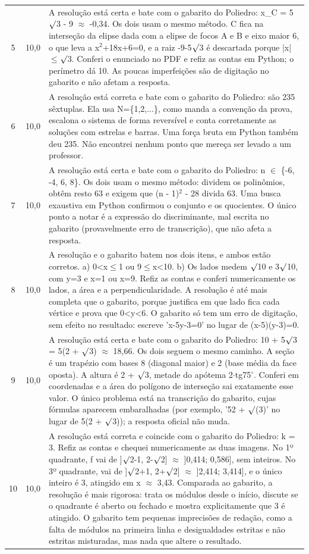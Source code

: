 \documentclass{article}%
\begin{document}
\begin{longtable}{@{}c c p{}@{}}
5 & 10,0 & A resolução está certa e bate com o gabarito do Poliedro: x\_C = 5$\surd$3 - 9 $\approx$ -0,34. Os dois usam o mesmo método. C fica na interseção da elipse dada com a elipse de focos A e B e eixo maior 6, o que leva a x$^2$+18x+6=0, e a raiz -9-5$\surd$3 é descartada porque |x|$\leq$$\surd$3. Conferi o enunciado no PDF e refiz as contas em Python; o perímetro dá 10. As poucas imperfeições são de digitação no gabarito e não afetam a resposta. \\
6 & 10,0 & A resolução está correta e bate com o gabarito do Poliedro: são 235 sêxtuplas. Ela usa N=\{1,2,...\}, como manda a convenção da prova, escalona o sistema de forma reversível e conta corretamente as soluções com estrelas e barras. Uma força bruta em Python também deu 235. Não encontrei nenhum ponto que mereça ser levado a um professor. \\
7 & 10,0 & A resolução está certa e bate com o gabarito do Poliedro: n $\in$ \{-6, -4, 6, 8\}. Os dois usam o mesmo método: dividem os polinômios, obtêm resto 63 e exigem que (n - 1)$^2$ - 28 divida 63. Uma busca exaustiva em Python confirmou o conjunto e os quocientes. O único ponto a notar é a expressão do discriminante, mal escrita no gabarito (provavelmente erro de transcrição), que não afeta a resposta. \\
8 & 10,0 & A resolução e o gabarito batem nos dois itens, e ambos estão corretos. a) 0<x$\leq$1 ou 9$\leq$x<10. b) Os lados medem $\surd$10 e 3$\surd$10, com y=3 e x=1 ou x=9. Refiz as contas e conferi numericamente os lados, a área e a perpendicularidade. A resolução é até mais completa que o gabarito, porque justifica em que lado fica cada vértice e prova que 0<y<6. O gabarito só tem um erro de digitação, sem efeito no resultado: escreve 'x-5y-3=0' no lugar de (x-5)(y-3)=0. \\
9 & 10,0 & A resolução está certa e bate com o gabarito do Poliedro: 10 + 5$\surd$3 = 5(2 + $\surd$3) $\approx$ 18,66. Os dois seguem o mesmo caminho. A seção é um trapézio com bases 8 (diagonal maior) e 2 (base média da face oposta). A altura é 2 + $\surd$3, metade do apótema 2$\cdot$tg75$^\circ$. Conferi em coordenadas e a área do polígono de interseção sai exatamente esse valor. O único problema está na transcrição do gabarito, cujas fórmulas aparecem embaralhadas (por exemplo, '52 + $\surd$(3)' no lugar de 5(2 + $\surd$3)); a resposta oficial não muda. \\
10 & 10,0 & A resolução está correta e coincide com o gabarito do Poliedro: k = 3. Refiz as contas e chequei numericamente as duas imagens. No 1º quadrante, f vai de {]}$\surd$2-1, 2-$\surd$2{]} $\approx$ {]}0,414; 0,586{]}, sem inteiros. No 3º quadrante, vai de {]}$\surd$2+1, 2+$\surd$2{]} $\approx$ {]}2,414; 3,414{]}, e o único inteiro é 3, atingido em x $\approx$ 3,43. Comparada ao gabarito, a resolução é mais rigorosa: trata os módulos desde o início, discute se o quadrante é aberto ou fechado e mostra explicitamente que 3 é atingido. O gabarito tem pequenas imprecisões de redação, como a falta de módulos na primeira linha e desigualdades estritas e não estritas misturadas, mas nada que altere o resultado. \\
\bottomrule\end{longtable}%
\end{document}
